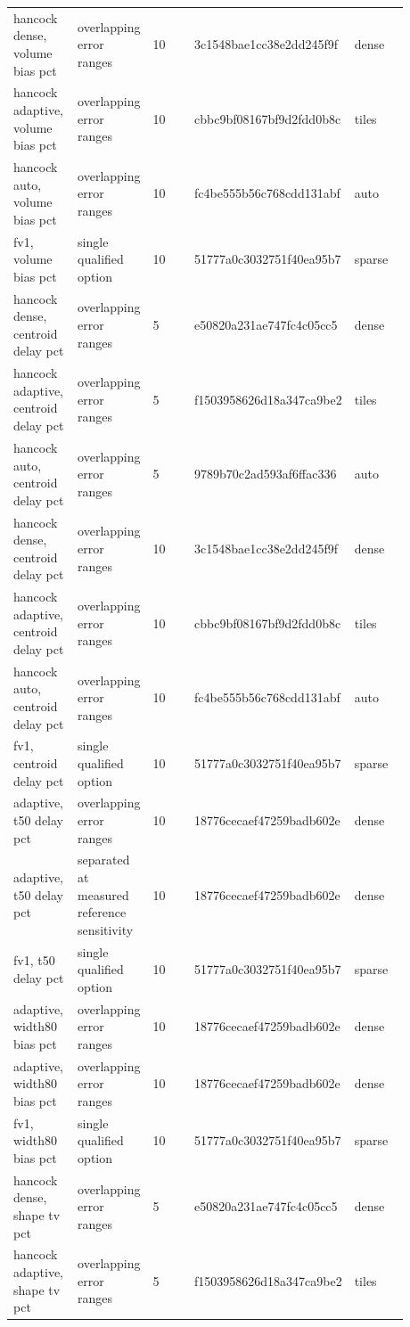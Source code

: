 \begin{longtable}{p{0.1760\linewidth}p{0.1760\linewidth}p{0.1760\linewidth}p{0.1760\linewidth}p{0.1760\linewidth}}
hancock dense, volume bias pct & overlapping error ranges & 10 & 3c1548bae1cc38e2dd245f9f & dense \\
hancock adaptive, volume bias pct & overlapping error ranges & 10 & cbbc9bf08167bf9d2fdd0b8c & tiles \\
hancock auto, volume bias pct & overlapping error ranges & 10 & fc4be555b56c768cdd131abf & auto \\
fv1, volume bias pct & single qualified option & 10 & 51777a0c3032751f40ea95b7 & sparse \\
hancock dense, centroid delay pct & overlapping error ranges & 5 & e50820a231ae747fc4c05cc5 & dense \\
hancock adaptive, centroid delay pct & overlapping error ranges & 5 & f1503958626d18a347ca9be2 & tiles \\
hancock auto, centroid delay pct & overlapping error ranges & 5 & 9789b70c2ad593af6ffac336 & auto \\
hancock dense, centroid delay pct & overlapping error ranges & 10 & 3c1548bae1cc38e2dd245f9f & dense \\
hancock adaptive, centroid delay pct & overlapping error ranges & 10 & cbbc9bf08167bf9d2fdd0b8c & tiles \\
hancock auto, centroid delay pct & overlapping error ranges & 10 & fc4be555b56c768cdd131abf & auto \\
fv1, centroid delay pct & single qualified option & 10 & 51777a0c3032751f40ea95b7 & sparse \\
adaptive, t50 delay pct & overlapping error ranges & 10 & 18776cecaef47259badb602e & dense \\
adaptive, t50 delay pct & separated at measured reference sensitivity & 10 & 18776cecaef47259badb602e & dense \\
fv1, t50 delay pct & single qualified option & 10 & 51777a0c3032751f40ea95b7 & sparse \\
adaptive, width80 bias pct & overlapping error ranges & 10 & 18776cecaef47259badb602e & dense \\
adaptive, width80 bias pct & overlapping error ranges & 10 & 18776cecaef47259badb602e & dense \\
fv1, width80 bias pct & single qualified option & 10 & 51777a0c3032751f40ea95b7 & sparse \\
hancock dense, shape tv pct & overlapping error ranges & 5 & e50820a231ae747fc4c05cc5 & dense \\
hancock adaptive, shape tv pct & overlapping error ranges & 5 & f1503958626d18a347ca9be2 & tiles \\

\end{longtable}
